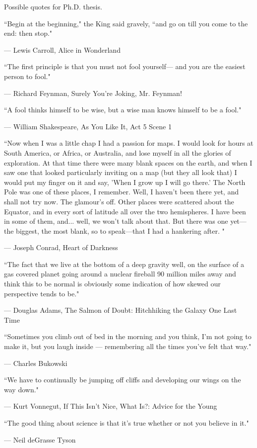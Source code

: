 \documentclass{report}
\begin{document}
Possible quotes for Ph.D. thesis.

\epigraph{``Begin at the beginning," the King said gravely, ``and go on till you come to the end: then stop."}{--- \textup{Lewis Carroll}, Alice in Wonderland}

\epigraph{``The first principle is that you must not fool yourself--- and you are the easiest person to fool."}{--- \textup{Richard Feynman}, Surely You're Joking, Mr. Feynman!}

\epigraph{``A fool thinks himself to be wise, but a wise man knows himself to be a fool."}{--- \textup{William Shakespeare}, As You Like It, Act 5 Scene 1}

\epigraph{``Now when I was a little chap I had a passion for maps. I would look for hours at South America, or Africa, or Australia, and lose myself in all the glories of exploration. At that time there were many blank spaces on the earth, and when I saw one that looked particularly inviting on a map (but they all look that) I would put my finger on it and say, 'When I grow up I will go there.' The North Pole was one of these places, I remember. Well, I haven't been there yet, and shall not try now. The glamour's off. Other places were scattered about the Equator, and in every sort of latitude all over the two hemispheres. I have been in some of them, and... well, we won't talk about that. But there was one yet—the biggest, the most blank, so to speak—that I had a hankering after.
"}{--- \textup{Joseph Conrad}, Heart of Darkness}

\epigraph{``The fact that we live at the bottom of a deep gravity well, on the surface of a gas covered planet going around a nuclear fireball 90 million miles away and think this to be normal is obviously some indication of how skewed our perspective tends to be." }{--- \textup{Douglas Adams}, The Salmon of Doubt: Hitchhiking the Galaxy One Last Time}

\epigraph{``Sometimes you climb out of bed in the morning and you think, I'm not going to make it, but you laugh inside — remembering all the times you've felt that way."}{--- \textup{Charles Bukowski}}

\epigraph{``We have to continually be jumping off cliffs and developing our wings on the way down."}{--- \textup{Kurt Vonnegut}, If This Isn't Nice, What Is?: Advice for the Young}

\epigraph{``The good thing about science is that it's true whether or not you believe in it."}{--- \textup{Neil deGrasse Tyson}}
\end{document}
